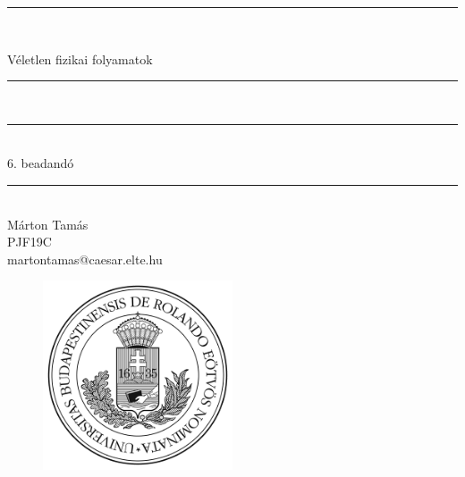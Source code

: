 \documentclass[a4paper, 12pt]{article}
\numberwithin{equation}{section}          %
\numberwithin{figure}{subsection}
\begin{document}
\begin{titlepage}   
\begin{center}
\thispagestyle{empty}  

\vspace*{0.7cm}
\rule{\linewidth}{0.5mm} \\[3mm]
\vspace*{0.7cm}

{\LARGE Véletlen fizikai folyamatok}

\vspace*{0.7cm}
\rule{\linewidth}{0.5mm} \\[3mm]
\rule{\linewidth}{0.5mm} \\[3mm]



{\Large 6. beadandó\\}

\vspace*{0.7cm}
\rule{\linewidth}{0.5mm} \\[3mm]
  {\small Márton Tamás} \\[3mm]
{\footnotesize PJF19C} \\
{\footnotesize martontamas@caesar.elte.hu}

  \vspace*{2cm}

\begin{figure}[h!]
\begin{center}
\includegraphics[width=0.5\textwidth]{./elte.png}
\end{center}
\end{figure}

\end{center}
\end{titlepage}
\end{document}
